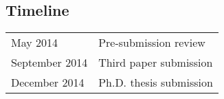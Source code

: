 \documentclass[useAMS,usenatbib,onecolumn]{mnras}
\begin{document}


\subsection*{Timeline}
\label{sec:timeline} 

\begin{tabular*}{0.75\textwidth}{ l l }
  May 2014  								& Pre-submission review \\
  September 2014							& Third paper submission \\							 
  December 2014  							& Ph.D. thesis submission \\
\end{tabular*}

\begin{multicols}{2}
	
	{\footnotesize
	\setlength{\itemsep}{1pt}
	\begin{spacing}{0.5}
		{}
	\end{spacing}	}
\end{multicols}
\end{document}
